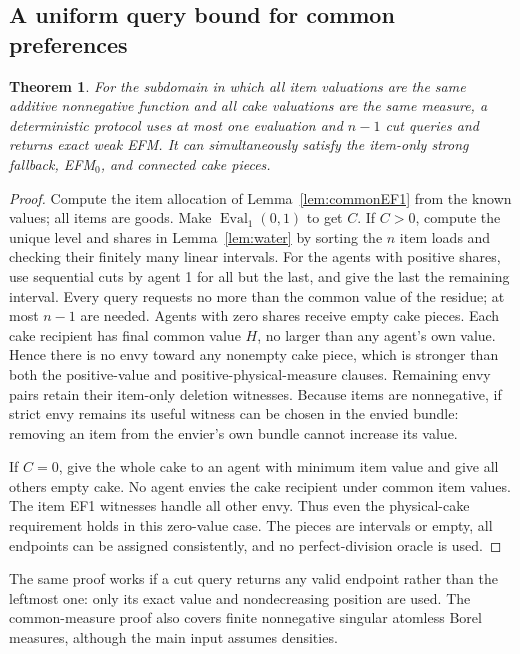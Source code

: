 \documentclass[11pt,a4paper]{article}
\newtheorem{theorem}{Theorem}[section]
\theoremstyle{remark}\newtheorem{remark}[theorem]{Remark}
\begin{document}
\subsection{A uniform query bound for common preferences}
\begin{theorem}\label{thm:RWcommon}
For the subdomain in which all item valuations are the same additive nonnegative function and all cake valuations are the same measure, a deterministic protocol uses at most one evaluation and $n-1$ cut queries and returns exact weak EFM. It can simultaneously satisfy the item-only strong fallback, EFM$_0$, and connected cake pieces.
\end{theorem}
\begin{proof}
Compute the item allocation of Lemma~\ref{lem:commonEF1} from the known values; all items are goods. Make $\operatorname{Eval}_1(0,1)$ to get $C$. If $C>0$, compute the unique level and shares in Lemma~\ref{lem:water} by sorting the $n$ item loads and checking their finitely many linear intervals. For the agents with positive shares, use sequential cuts by agent 1 for all but the last, and give the last the remaining interval. Every query requests no more than the common value of the residue; at most $n-1$ are needed. Agents with zero shares receive empty cake pieces. Each cake recipient has final common value $H$, no larger than any agent's own value. Hence there is no envy toward any nonempty cake piece, which is stronger than both the positive-value and positive-physical-measure clauses. Remaining envy pairs retain their item-only deletion witnesses. Because items are nonnegative, if strict envy remains its useful witness can be chosen in the envied bundle: removing an item from the envier's own bundle cannot increase its value.

If $C=0$, give the whole cake to an agent with minimum item value and give all others empty cake. No agent envies the cake recipient under common item values. The item EF1 witnesses handle all other envy. Thus even the physical-cake requirement holds in this zero-value case. The pieces are intervals or empty, all endpoints can be assigned consistently, and no perfect-division oracle is used.
\end{proof}
The same proof works if a cut query returns any valid endpoint rather than the leftmost one: only its exact value and nondecreasing position are used. The common-measure proof also covers finite nonnegative singular atomless Borel measures, although the main input assumes densities.
\end{document}
